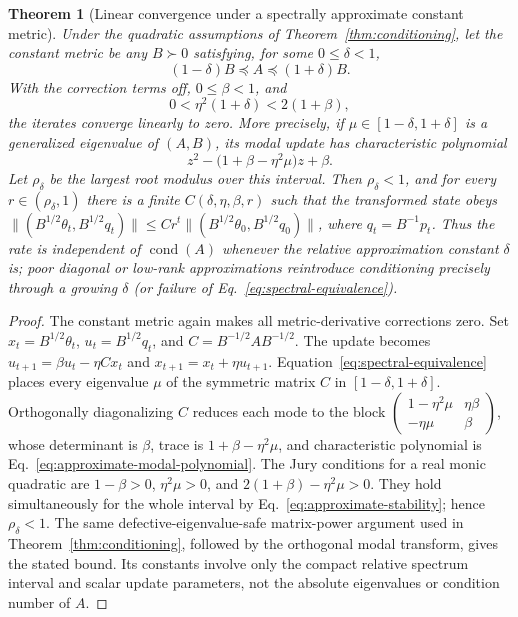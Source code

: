 \documentclass[10pt,twocolumn]{article}
\newtheorem{theorem}{Theorem}
\begin{document}
\begin{theorem}[Linear convergence under a spectrally approximate constant metric]
\label{thm:approximate-metric}
Under the quadratic assumptions of Theorem~\ref{thm:conditioning}, let the
constant metric be any $B\succ0$ satisfying, for some $0\le\delta<1$,
\begin{equation}
 (1-\delta)B\preceq A\preceq(1+\delta)B.
 \label{eq:spectral-equivalence}
\end{equation}
With the correction terms off, $0\le\beta<1$, and
\begin{equation}
 0<\eta^2(1+\delta)<2(1+\beta),
 \label{eq:approximate-stability}
\end{equation}
the iterates converge linearly to zero. More precisely, if
$\mu\in[1-\delta,1+\delta]$ is a generalized eigenvalue of $(A,B)$,
its modal update has characteristic polynomial
\begin{equation}
 z^2-\bigl(1+\beta-\eta^2\mu\bigr)z+\beta.
 \label{eq:approximate-modal-polynomial}
\end{equation}
Let $\rho_\delta$ be the largest root modulus over this interval. Then
$\rho_\delta<1$, and for every $r\in(\rho_\delta,1)$ there is a finite
$C(\delta,\eta,\beta,r)$ such that the transformed state obeys
$\|(B^{1/2}\theta_t,B^{1/2}q_t)\|\le
C r^t\|(B^{1/2}\theta_0,B^{1/2}q_0)\|$, where $q_t=B^{-1}p_t$.
Thus the rate is independent of $\operatorname{cond}(A)$ whenever the
relative approximation constant $\delta$ is; poor diagonal or low-rank
approximations reintroduce conditioning precisely through a growing
$\delta$ (or failure of Eq.~\eqref{eq:spectral-equivalence}).
\end{theorem}

\begin{proof}
The constant metric again makes all metric-derivative corrections zero. Set
$x_t=B^{1/2}\theta_t$, $u_t=B^{1/2}q_t$, and
$C=B^{-1/2}AB^{-1/2}$. The update becomes
$u_{t+1}=\beta u_t-\eta Cx_t$ and
$x_{t+1}=x_t+\eta u_{t+1}$. Equation~\eqref{eq:spectral-equivalence}
places every eigenvalue $\mu$ of the symmetric matrix $C$ in
$[1-\delta,1+\delta]$. Orthogonally diagonalizing $C$ reduces each mode to
the block
$\left(\begin{smallmatrix}1-\eta^2\mu&\eta\beta\\-\eta\mu&\beta\end{smallmatrix}\right)$,
whose determinant is $\beta$, trace is $1+\beta-\eta^2\mu$, and
characteristic polynomial is Eq.~\eqref{eq:approximate-modal-polynomial}.
The Jury conditions for a real monic quadratic are
$1-\beta>0$, $\eta^2\mu>0$, and
$2(1+\beta)-\eta^2\mu>0$. They hold simultaneously for the whole interval
by Eq.~\eqref{eq:approximate-stability}; hence $\rho_\delta<1$.
The same defective-eigenvalue-safe matrix-power argument used in
Theorem~\ref{thm:conditioning}, followed by the orthogonal modal transform,
gives the stated bound. Its constants involve only the compact relative
spectrum interval and scalar update parameters, not the absolute eigenvalues
or condition number of $A$.
\end{proof}
\end{document}

